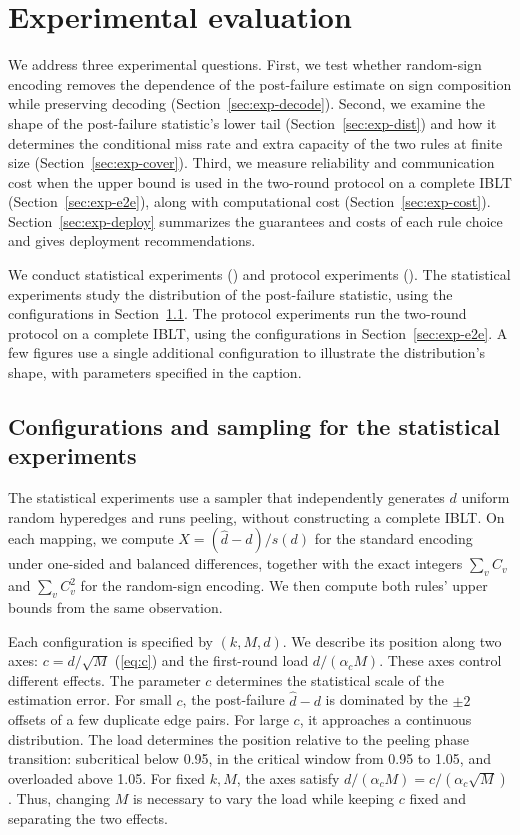 \section{Experimental evaluation}\label{sec:exp}
We address three experimental questions. First, we test whether random-sign encoding removes the dependence of the post-failure estimate on sign composition while preserving decoding (Section~\ref{sec:exp-decode}). Second, we examine the shape of the post-failure statistic's lower tail (Section~\ref{sec:exp-dist}) and how it determines the conditional miss rate and extra capacity of the two rules at finite size (Section~\ref{sec:exp-cover}). Third, we measure reliability and communication cost when the upper bound is used in the two-round protocol on a complete IBLT (Section~\ref{sec:exp-e2e}), along with computational cost (Section~\ref{sec:exp-cost}). Section~\ref{sec:exp-deploy} summarizes the guarantees and costs of each rule choice and gives deployment recommendations.

We conduct statistical experiments () and protocol experiments (). The statistical experiments study the distribution of the post-failure statistic, using the configurations in Section~\ref{sec:exp-setup}. The protocol experiments run the two-round protocol on a complete IBLT, using the configurations in Section~\ref{sec:exp-e2e}. A few figures use a single additional configuration to illustrate the distribution's shape, with parameters specified in the caption.

\subsection{Configurations and sampling for the statistical experiments}\label{sec:exp-setup}
The statistical experiments use a sampler that independently generates $d$ uniform random hyperedges and runs peeling, without constructing a complete IBLT. On each mapping, we compute $X=(\widehat d-d)/s(d)$ for the standard encoding under one-sided and balanced differences, together with the exact integers $\sum_vC_v$ and $\sum_vC_v^2$ for the random-sign encoding. We then compute both rules' upper bounds from the same observation.

Each configuration is specified by $(k,M,d)$. We describe its position along two axes: $c=d/\sqrt M$ (\eqref{eq:c}) and the first-round load $d/(\alpha_cM)$. These axes control different effects. The parameter $c$ determines the statistical scale of the estimation error. For small $c$, the post-failure $\widehat d-d$ is dominated by the $\pm2$ offsets of a few duplicate edge pairs. For large $c$, it approaches a continuous distribution. The load determines the position relative to the peeling phase transition: subcritical below 0.95, in the critical window from 0.95 to 1.05, and overloaded above 1.05. For fixed $k,M$, the axes satisfy $d/(\alpha_cM)=c/(\alpha_c\sqrt M)$. Thus, changing $M$ is necessary to vary the load while keeping $c$ fixed and separating the two effects.

